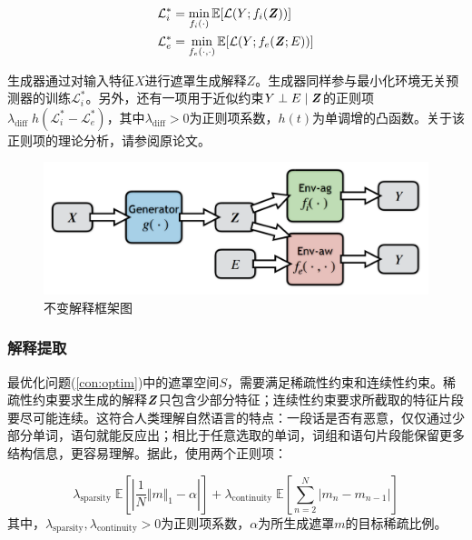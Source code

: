 \begin{equation}
    \begin{aligned}
    \mathcal{L}_i^* &= \min_{f_i(\cdot)} \mathbb{E}[\mathcal{L}(Y;f_i(\textbf{\textit{Z}}))] \\
    \mathcal{L}_e^* &= \min_{f_e(\cdot,\cdot)} \mathbb{E}[\mathcal{L}(Y;f_e(\textbf{\textit{Z}};E))]
    \end{aligned}
\end{equation}

生成器通过对输入特征$X$进行遮罩生成解释$Z$。生成器同样参与最小化环境无关预测器的训练$\mathcal{L}_i^*$。另外，还有一项用于近似约束$Y \perp E \mid \textbf{\textit{Z}}$的正则项$\lambda_{\text{diff}} \; h(\mathcal{L}_i^*-\mathcal{L}_e^*)$，其中$\lambda_{\text{diff}} > 0$为正则项系数，$h(t)$为单调增的凸函数。关于该正则项的理论分析，请参阅原论文\cite{chang2020invariant}。

\begin{figure}
    \centering
    \includegraphics[width=.7\textwidth]{figs/invrat_model.png}
    \caption{不变解释框架图\cite{chang2020invariant}}
    \label{fig:invrat}
\end{figure}

\subsubsection{解释提取}

最优化问题(\ref{con:optim})中的遮罩空间$S$，需要满足稀疏性约束和连续性约束。稀疏性约束要求生成的解释$\textbf{\textit{Z}}$只包含少部分特征；连续性约束要求所截取的特征片段要尽可能连续。这符合人类理解自然语言的特点：一段话是否有恶意，仅仅通过少部分单词，语句就能反应出；相比于任意选取的单词，词组和语句片段能保留更多结构信息，更容易理解。据此，使用两个正则项\cite{changGameTheoreticApproach2019}：

\begin{equation}
    \lambda_{\text{sparsity}}\; \mathbb{E} \left[ \left| \frac{1}{N} \Vert m \Vert_1 -\alpha \right| \right]
    + 
    \lambda_{\text{continuity}}\; \mathbb{E} \left[ \sum_{n=2}^{N} \left| m_n-m_{n-1} \right|
    \right]
\end{equation}
其中，$\lambda_{\text{sparsity}},\lambda_{\text{continuity}}>0$为正则项系数，$\alpha$为所生成遮罩$m$的目标稀疏比例。

